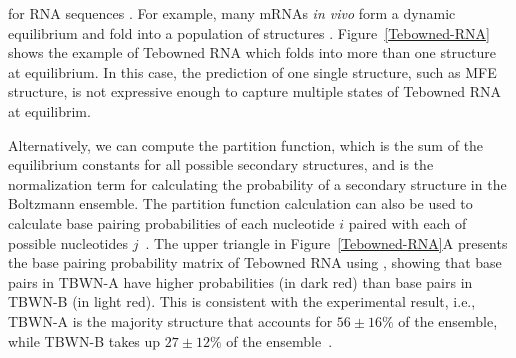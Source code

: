 for RNA sequences \cite{mathews:2004}.
For example, many mRNAs {\textit {in vivo}} form a dynamic equilibrium and fold into a population of structures \cite{Long+:2007, Lu+:2008, Tafer+:2008, lai+:2018}. 
Figure~\ref{Tebowned-RNA} shows the example of Tebowned RNA
which folds into more than one structure at equilibrium.
In this case, the prediction of one single structure, such as MFE structure, 
is not expressive enough to capture multiple states of Tebowned RNA %
at equilibrim.

Alternatively, we can compute the partition function, 
which is the sum of the equilibrium constants for all possible secondary structures,
and is the normalization term for calculating the probability of a secondary structure in the Boltzmann ensemble.
The partition function calculation can also be used to 
calculate base pairing probabilities of each nucleotide $i$ paired with each of possible nucleotides $j$~\cite{mccaskill:1990, mathews:2004}. 
The upper triangle in Figure~\ref{Tebowned-RNA}A presents the base pairing probability matrix of Tebowned RNA using \viennarnafold, 
showing that base pairs in TBWN-A have higher probabilities (in dark red) than
base pairs in TBWN-B (in light red).
This is consistent with the experimental result, i.e.,
TBWN-A is the majority structure that accounts for $56 \pm 16\%$ of the ensemble, 
while TBWN-B takes up $27 \pm 12\%$ of the ensemble~\cite{Cordero+Das:2015}.

